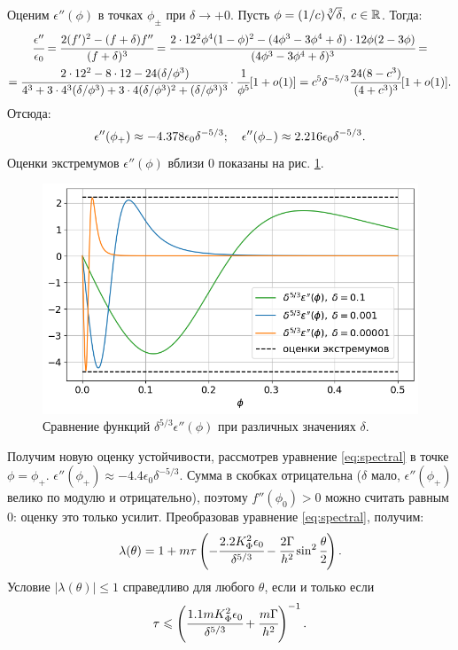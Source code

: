 Оценим $\epsilon''(\phi)$ в точках $\phi_{\pm}$ при $\delta \to +0$. Пусть $\phi = (1 / c) \sqrt[3]{\delta}, \; c \in {\mathbb{R}}$. Тогда:
\begin{multline*}
    \cfrac{\epsilon''}{\epsilon_0} = \cfrac{2(f')^2 - (f + \delta)f''}{(f + \delta)^3} = \cfrac{2 \cdot 12^2 \phi^4 (1 - \phi)^2 - (4 \phi^3 - 3 \phi^4 + \delta) \cdot 12 \phi (2 - 3 \phi)}{(4 \phi^3 - 3 \phi^4 + \delta)^3} = \\ = \cfrac{2 \cdot 12^2 - 8 \cdot 12 - 24 (\delta / \phi^3)}{4^3 + 3 \cdot 4^3 (\delta / \phi^3) + 3 \cdot 4 (\delta / \phi^3)^2 + (\delta / \phi^3)^3} \cdot \cfrac{1}{\phi^5}[1 + o(1)] = c^5 \delta^{-5 / 3} \cfrac{24(8 - c^3)}{(4 + c^3)^3}[1 + o(1)] {\text{.}}
\end{multline*}
Отсюда:
\begin{equation}
    \epsilon''(\phi_+) \approx -4.378 \epsilon_0 \delta^{-5 / 3}; \quad \epsilon''(\phi_-) \approx 2.216 \epsilon_0 \delta^{-5 / 3} {\text{.}}
    \label{est:epsilon_phi_phi_bounds}
\end{equation}
Оценки экстремумов $\epsilon''(\phi)$ вблизи $0$ показаны на рис. \ref{fig:eps_phi_phi_multiplied}.

\begin{figure}[!tp]
    \centering
    \includegraphics[width=\textwidth]{figures/eps_phi_phi_multiplied.png}
    \caption{Сравнение функций $\delta^{5 / 3} \epsilon''(\phi)$ при различных значениях $\delta$.}
    \label{fig:eps_phi_phi_multiplied}
\end{figure}

Получим новую оценку устойчивости, рассмотрев уравнение \eqref{eq:spectral} в точке $\phi = \phi_+$. $\epsilon''(\phi_+) \approx -4.4 \epsilon_0 \delta^{-5 / 3}$. Сумма в скобках отрицательна ($\delta$ мало, $\epsilon''(\phi_+)$ велико по модулю и отрицательно), поэтому $f''(\phi_0) > 0$ можно считать равным $0$: оценку это только усилит. Преобразовав уравнение \eqref{eq:spectral}, получим:
$$\lambda(\theta) = 1 + m \tau \left( -\cfrac{2.2 K_\Phi^2 \epsilon_0}{\delta^{5 / 3}} - \cfrac{2 \Gamma}{h^2} \sin^2 \cfrac{\theta}{2} \right) {\text{.}}$$
Условие $|\lambda(\theta)| \leqslant 1$ справедливо для любого $\theta$, если и только если
\begin{equation}
    \tau \leqslant \left( \cfrac{1.1 m K_\Phi^2 \epsilon_0}{\delta^{5 / 3}} + \cfrac{m \Gamma}{h^2} \right)^{-1} {\text{.}}
    \label{cond:spectral_better_theoretical}
\end{equation}

